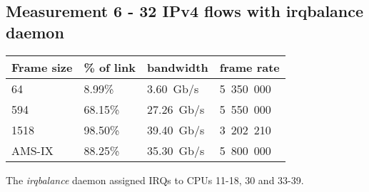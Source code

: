 
\subsection{Measurement 6 - 32 IPv4 flows with irqbalance daemon}

\begin{tabular}{ | l | l | l | l | }
\hline
Frame size & \% of link & bandwidth & frame rate \\
\hline
64     &  8.99\% &  3.60~Gb/s & 5~350~000 \\
594    & 68.15\% & 27.26~Gb/s & 5~550~000 \\
1518   & 98.50\% & 39.40~Gb/s & 3~202~210 \\
AMS-IX & 88.25\% & 35.30~Gb/s & 5~800~000 \\
\hline
\end{tabular}

The {\it{irqbalance}} daemon assigned IRQs to CPUs 11-18, 30 and 33-39.

\newpage

